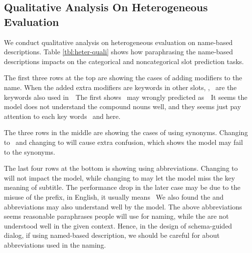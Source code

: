 \subsection[Qualitative Analysis On Heterogeneous
Evaluation]{Qualitative Analysis On Heterogeneous \\Evaluation}
\label{ssec:qualitative-analysis}
We conduct qualitative analysis on heterogeneous evaluation on
name-based descriptions. Table \ref{tbl:heter-quali} shows how
paraphrasing the name-based descriptions impacts on the categorical and
noncategorical slot prediction tasks.

The first three rows at the top are showing the cases of adding modifiers
to the name. When the added extra modifiers are keywords in other
slots, \eg,~ are the keywords also used
in~~The first
shows~ may wrongly predicted
as~~It seems the model does not understand
the compound nouns well, and they seems just pay attention to each key
words~ and  here.

The three rows in the middle are showing the cases of using
synonyms. Changing  to ~and changing  to  will
cause extra confusion, which shows the model may fail to the synonyms.

The last four rows at the bottom is showing using abbreviations. Changing
 to  will not impact the model, while
changing  to  may let the model miss
the key meaning of subtitle.  The performance drop in the later case
may be due to the misuse of the  prefix, in English, it
usually means ~We also
found the  and  abbreviations may also understand well by
the model. The above abbreviations seems reasonable paraphrases people
will use for naming, while the are not understood well in the given
context. Hence, in the design of schema-guided dialog, if using
named-based description, we should be careful for about abbreviations
used in the naming.


